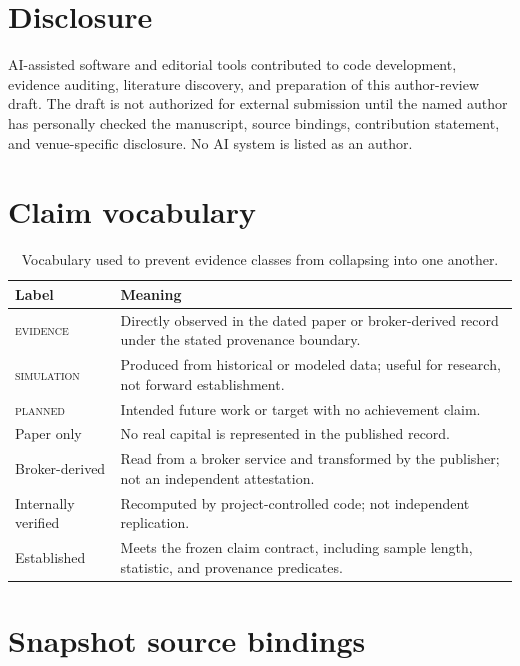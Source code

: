 \documentclass[11pt]{article}
\newcommand{\evidence}{\textsc{evidence}}
\newcommand{\simulation}{\textsc{simulation}}
\newcommand{\planned}{\textsc{planned}}
\begin{document}
\section*{Disclosure}

AI-assisted software and editorial tools contributed to code development, evidence auditing, literature discovery, and preparation of this author-review draft. The draft is not authorized for external submission until the named author has personally checked the manuscript, source bindings, contribution statement, and venue-specific disclosure. No AI system is listed as an author.




\appendix
\section{Claim vocabulary}

\begin{table}[H]
\centering
\small
\begin{tabularx}{\linewidth}{>{\raggedright\arraybackslash}p{31mm}X}
\toprule
Label & Meaning \\
\midrule
\evidence & Directly observed in the dated paper or broker-derived record under the stated provenance boundary. \\
\simulation & Produced from historical or modeled data; useful for research, not forward establishment. \\
\planned & Intended future work or target with no achievement claim. \\
Paper only & No real capital is represented in the published record. \\
Broker-derived & Read from a broker service and transformed by the publisher; not an independent attestation. \\
Internally verified & Recomputed by project-controlled code; not independent replication. \\
Established & Meets the frozen claim contract, including sample length, statistic, and provenance predicates. \\
\bottomrule
\end{tabularx}
\caption{Vocabulary used to prevent evidence classes from collapsing into one another.}
\end{table}

\section{Snapshot source bindings}
\end{document}
